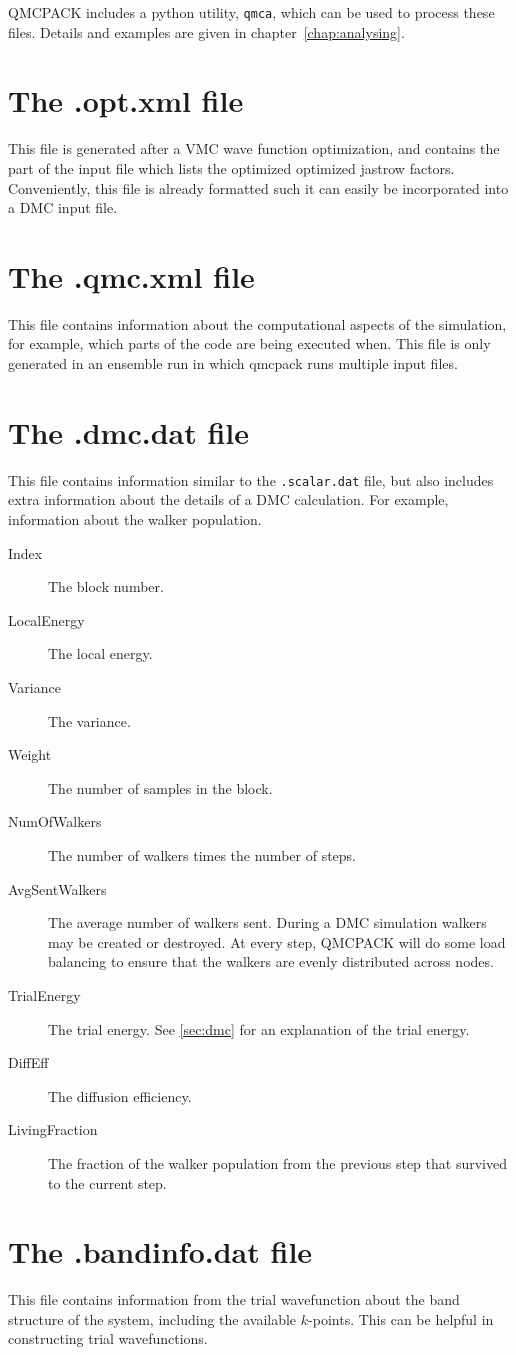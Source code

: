 QMCPACK includes a python utility, \texttt{qmca}, which can be used to process these files. Details and examples are given in chapter~\ref{chap:analysing}.
\section{The .opt.xml file}
\label{sec:optxml_file}
This file is generated after a VMC wave function optimization, and contains the part of the input file which lists the optimized optimized jastrow factors.
Conveniently, this file is already formatted such it can easily be incorporated into a DMC input file.

\section{The .qmc.xml file}
\label{sec:qmc_file}
This file contains information about the computational aspects of the simulation, for example, which parts of the code are being executed when. This file is only generated in an ensemble run in which qmcpack runs multiple input files.

\section{The .dmc.dat file}
\label{sec:dmc_file}
This file contains information similar to the \texttt{.scalar.dat} file, but also includes extra information about the details of a DMC calculation. For example, information about the walker population.

\begin{description}
\item[Index] The block number.
\item[LocalEnergy] The local energy.
\item[Variance] The variance.
\item[Weight] The number of samples in the block.
\item[NumOfWalkers] The number of walkers times the number of steps.
\item[AvgSentWalkers] The average number of walkers sent. During a DMC simulation walkers may be created or destroyed. At every step, QMCPACK will do some load balancing to ensure that the walkers are evenly distributed across nodes.
\item[TrialEnergy] The trial energy. See \ref{sec:dmc} for an explanation of the trial energy.
\item[DiffEff] The diffusion efficiency.
\item[LivingFraction] The fraction of the walker population from the previous step that survived to the current step.
\end{description}


\section{The .bandinfo.dat file}
\label{sec:bandinfo_file}
This file contains information from the trial wavefunction about the band structure of the system,
including the available $k$-points. This can
be helpful in constructing trial wavefunctions.

